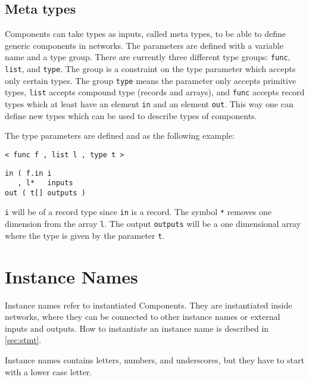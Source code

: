 \subsection{Meta types}\label{sec:meta}
Components can take types as inputs, called meta types, to be able to
define generic components in networks. The parameters are defined with
a variable name and a type group. There are currently three different
type groups: \verb#func#, \verb#list#, and \verb#type#. The group is a
constraint on the type parameter which accepts only certain types. The
group \verb#type# means the parameter only accepts primitive types,
\verb#list# accepts compound type (records and arrays), and
\verb#func# accepts record types which at least have an element
\verb#in# and an element \verb#out#. This way one can define new types
which can be used to describe types of components.

The type parameters are defined and as the following example:

\begin{verbatim}
< func f , list l , type t >
\end{verbatim}

\begin{verbatim}
in ( f.in i
   , l*   inputs
out ( t[] outputs )
\end{verbatim}

\verb#i# will be of a record type since \verb#in# is a record. The
symbol \verb#*# removes one dimension from the array \verb#l#. The
output \verb#outputs# will be a one dimensional array where the type
is given by the parameter \verb#t#.





\section{Instance Names}
Instance names refer to instantiated Components. They are instantiated
inside networks, where they can be connected to other instance names
or external inputs and outputs. How to instantiate an instance name is
described in \autoref{sec:stmt}.

Instance names contains letters, numbers, and underscores, but they
have to start with a lower case letter.


